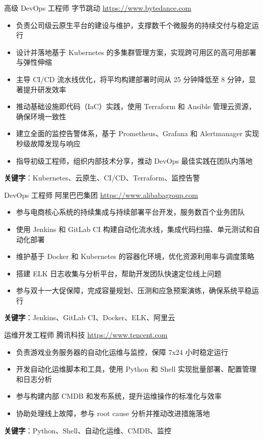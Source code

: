 \documentclass[a4paper, serif, 10pt]{moderncv}
\begin{document}
        {高级 DevOps 工程师}
        {字节跳动}
        {\url{https://www.bytedance.com}}
        {}
        {\begin{itemize}
\item 负责公司级云原生平台的建设与维护，支撑数千个微服务的持续交付与稳定运行
\item 设计并落地基于 Kubernetes 的多集群管理方案，实现跨可用区的高可用部署与弹性伸缩
\item 主导 CI/CD 流水线优化，将平均构建部署时间从 25 分钟降低至 8 分钟，显著提升研发效率
\item 推动基础设施即代码（IaC）实践，使用 Terraform 和 Ansible 管理云资源，确保环境一致性
\item 建立全面的监控告警体系，基于 Prometheus、Grafana 和 Alertmanager 实现秒级故障发现与响应
\item 指导初级工程师，组织内部技术分享，推动 DevOps 最佳实践在团队内落地
\end{itemize}
\textbf{关键字}：Kubernetes、云原生、CI/CD、Terraform、监控告警}

        {DevOps 工程师}
        {阿里巴巴集团}
        {\url{https://www.alibabagroup.com}}
        {}
        {\begin{itemize}
\item 参与电商核心系统的持续集成与持续部署平台开发，服务数百个业务团队
\item 使用 Jenkins 和 GitLab CI 构建自动化流水线，集成代码扫描、单元测试和自动化部署
\item 维护基于 Docker 和 Kubernetes 的容器化环境，优化资源利用率与调度策略
\item 搭建 ELK 日志收集与分析平台，帮助开发团队快速定位线上问题
\item 参与双十一大促保障，完成容量规划、压测和应急预案演练，确保系统平稳运行
\end{itemize}
\textbf{关键字}：Jenkins、GitLab CI、Docker、ELK、阿里云}

        {运维开发工程师}
        {腾讯科技}
        {\url{https://www.tencent.com}}
        {}
        {\begin{itemize}
\item 负责游戏业务服务器的自动化运维与监控，保障 7x24 小时稳定运行
\item 开发自动化运维脚本和工具，使用 Python 和 Shell 实现批量部署、配置管理和日志分析
\item 参与构建内部 CMDB 和发布系统，提升运维操作的标准化与效率
\item 协助处理线上故障，参与 root cause 分析并推动改进措施落地
\end{itemize}
\textbf{关键字}：Python、Shell、自动化运维、CMDB、监控}
\end{document}
